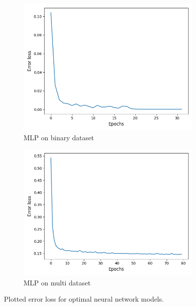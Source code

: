 \documentclass[letterpaper,12pt]{article}
\begin{document}
\begin{figure}[h]
\centering
\begin{subfigure}{.5\textwidth}
  \centering
  \includegraphics[width=\textwidth]{report/figures/binary_error_loss.png}
  \caption{MLP on binary dataset}
  \label{fig:binary_error_loss}
\end{subfigure}%
\begin{subfigure}{.5\textwidth}
  \centering
  \includegraphics[width=\textwidth]{report/figures/multi_error_loss.png}
  \caption{MLP on multi dataset}
  \label{fig:multi_error_loss}
\end{subfigure}
\caption{\label{fig:error_loss}Plotted error loss for optimal neural network models.}
\end{figure}
\end{document}
